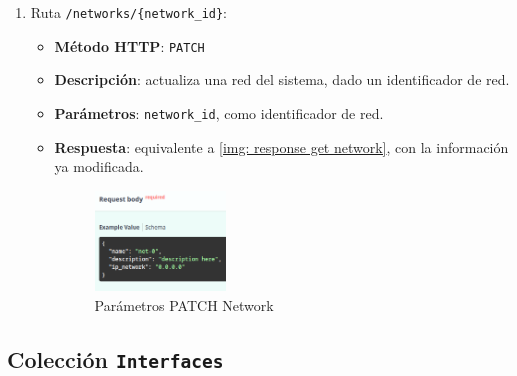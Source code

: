 \documentclass[a4paper, oneside, 12pt]{book}
\begin{document}
\begin{enumerate}
		\pagebreak
		
		\item Ruta \texttt{/networks/\{network\_id\}}:
		
		\begin{itemize}
			\item \textbf{Método HTTP}: \texttt{PATCH}
			\item \textbf{Descripción}: actualiza una red del sistema, dado un identificador de red. 
			\item \textbf{Parámetros}: \texttt{network\_id}, como identificador de red.
			\item \textbf{Respuesta}: equivalente a \ref{img: response get network}, con la información ya modificada.
			
			\begin{figure}[h!]
				\begin{center}
					\includegraphics[width=0.35\textwidth]{img/parameters_patch_networks.png}
					\caption{Parámetros PATCH Network}
					\label{img: parameters patch network}
				\end{center}
			\end{figure}
		\end{itemize}
	
	\end{enumerate}
	
	\subsection{Colección \texttt{Interfaces}}
	
\end{document}
